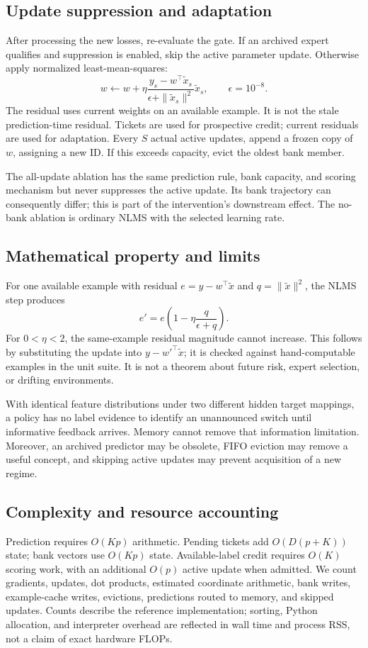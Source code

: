 \documentclass[10pt]{article}
\begin{document}
\subsection{Update suppression and adaptation}
After processing the new losses, re-evaluate the gate. If an archived expert qualifies and suppression is enabled, skip the active parameter update. Otherwise apply normalized least-mean-squares:
\[
 w\leftarrow w+
 \eta\frac{y_s-w^\top\tilde x_s}{\epsilon+\|\tilde x_s\|^2}
 \tilde x_s,\qquad \epsilon=10^{-8}.
\]
The residual uses current weights on an available example. It is not the stale prediction-time residual. Tickets are used for prospective credit; current residuals are used for adaptation. Every $S$ actual active updates, append a frozen copy of $w$, assigning a new ID. If this exceeds capacity, evict the oldest bank member.

The all-update ablation has the same prediction rule, bank capacity, and scoring mechanism but never suppresses the active update. Its bank trajectory can consequently differ; this is part of the intervention's downstream effect. The no-bank ablation is ordinary NLMS with the selected learning rate.

\subsection{Mathematical property and limits}
For one available example with residual $e=y-w^\top\tilde x$ and $q=\|\tilde x\|^2$, the NLMS step produces
\[
 e'=e\left(1-\eta\frac{q}{\epsilon+q}\right).
\]
For $0<\eta<2$, the same-example residual magnitude cannot increase. This follows by substituting the update into $y-w'^\top\tilde x$; it is checked against hand-computable examples in the unit suite. It is not a theorem about future risk, expert selection, or drifting environments.

With identical feature distributions under two different hidden target mappings, a policy has no label evidence to identify an unannounced switch until informative feedback arrives. Memory cannot remove that information limitation. Moreover, an archived predictor may be obsolete, FIFO eviction may remove a useful concept, and skipping active updates may prevent acquisition of a new regime.

\subsection{Complexity and resource accounting}
Prediction requires $O(Kp)$ arithmetic. Pending tickets add $O(D(p+K))$ state; bank vectors use $O(Kp)$ state. Available-label credit requires $O(K)$ scoring work, with an additional $O(p)$ active update when admitted. We count gradients, updates, dot products, estimated coordinate arithmetic, bank writes, example-cache writes, evictions, predictions routed to memory, and skipped updates. Counts describe the reference implementation; sorting, Python allocation, and interpreter overhead are reflected in wall time and process RSS, not a claim of exact hardware FLOPs.
\end{document}

